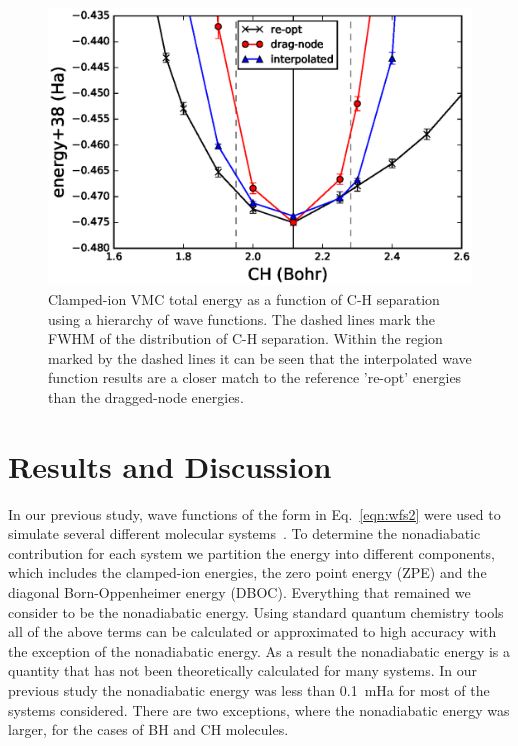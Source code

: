 \documentclass[aip,jcp,numerical,reprint]{revtex4-1}
\begin{document}
\begin{figure}[h]
\includegraphics[scale=0.5]{CH-cold}
\caption{Clamped-ion VMC total energy as a function of C-H separation using a hierarchy of wave functions. The dashed lines mark the FWHM of the distribution of C-H separation.  Within the region marked by the dashed lines it can be seen that the interpolated wave function results are a closer match to the reference 're-opt' energies than the dragged-node energies.  \label{fig:ch-cold}}
\end{figure}

\section{Results and Discussion}

In our previous study, wave functions of the form in Eq.~\eqref{eqn:wfs2} were used to simulate several different molecular systems~\cite{Yang2015}. To determine the nonadiabatic contribution for each system we partition the energy into different components, which includes the clamped-ion energies, the zero point energy (ZPE) and the diagonal Born-Oppenheimer energy (DBOC).   Everything that remained we consider to be the nonadiabatic energy.   Using standard quantum chemistry tools all of the above terms can be calculated or approximated to high accuracy with the exception of the nonadiabatic energy.  As a result the nonadiabatic energy is a quantity that has not been theoretically calculated for many systems. In our previous study the nonadiabatic energy was less than 0.1~mHa for most of the systems considered.   There are two exceptions, where the nonadiabatic energy was larger, for the cases of  BH and CH molecules.   %
\end{document}
